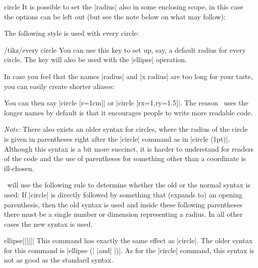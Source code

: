 \begin{pathoperation}{circle}{}
    It is possible to set the |radius| also in some enclosing scope, in this
    case the options can be left out (but see the note below on what may
    follow):
\begin{codeexample}[]
\end{codeexample}

    The following style is used with every circle:
    \begin{stylekey}{/tikz/every circle}
        You can use this key to set up, say, a default radius for every circle.
        The key will also be used with the |ellipse| operation.
    \end{stylekey}

    In case you feel that the names |radius| and |x radius| are too long for
    your taste, you can easily create shorter aliases:
\begin{codeexample}
\end{codeexample}
    You can then say |circle [r=1cm]| or |circle [rx=1,ry=1.5]|. The reason
    \tikzname\ uses the longer names by default is that it encourages people to
    write more readable code.

    \emph{Note:} There also exists an older syntax for circles, where the
    radius of the circle is given in parentheses right after the |circle|
    command as in |circle (1pt)|. Although this syntax is a bit more succinct,
    it is harder to understand for readers of the code and the use of
    parentheses for something other than a coordinate is ill-chosen.

    \tikzname\ will use the following rule to determine whether the old or the
    normal syntax is used: If |circle| is directly followed by something that
    (expands to) an opening parenthesis, then the old syntax is used and inside
    these following parentheses there must be a single number or dimension
    representing a radius. In all other cases the new syntax is used.
\end{pathoperation}

\begin{pathoperation}{ellipse}{|[||]|}
    This command has exactly the same effect as |circle|. The older syntax for
    this command is |ellipse (| |and| |)|. As for
    the |circle| command, this syntax is not as good as the standard syntax.
\begin{codeexample}[]
\end{codeexample}
\end{pathoperation}


